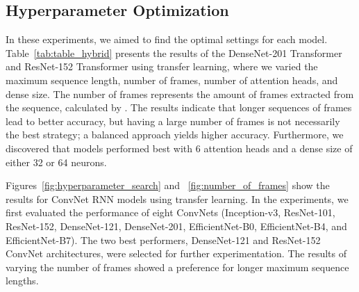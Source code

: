 \documentclass[fleqn,10pt]{wlscirep}
\begin{document}
\subsection{Hyperparameter Optimization}


In these experiments, we aimed to find the optimal settings for each model. Table~\ref{tab:table_hybrid} presents the results of the DenseNet-201 Transformer and ResNet-152 Transformer using transfer learning, where we varied the maximum sequence length, number of frames, number of attention heads, and dense size. The number of frames represents the amount of frames extracted from the sequence, calculated by . The results indicate that longer sequences of frames lead to better accuracy, but having a large number of frames is not necessarily the best strategy; a balanced approach yields higher accuracy. Furthermore, we discovered that models performed best with 6 attention heads and a dense size of either 32 or 64 neurons.

Figures~\ref{fig:hyperparameter_search} and ~\ref{fig:number_of_frames} show the results for ConvNet RNN models using transfer learning. In the experiments, we first evaluated the performance of eight ConvNets (Inception-v3, ResNet-101, ResNet-152, DenseNet-121, DenseNet-201, EfficientNet-B0, EfficientNet-B4, and EfficientNet-B7). The two best performers, DenseNet-121 and ResNet-152 ConvNet architectures, were selected for further experimentation. The results of varying the number of frames showed a preference for longer maximum sequence lengths.
\end{document}
